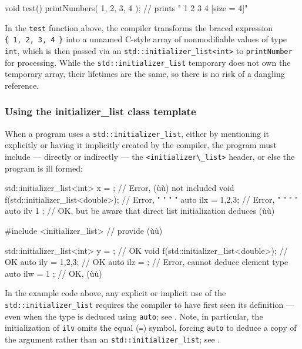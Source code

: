 \begin{emcppslisting}
void test()
{
    printNumbers({ 1, 2, 3, 4 });  // prints "{ 1 2 3 4 } [size = 4]"
}
\end{emcppslisting}
    

\noindent In the \lstinline!test! function above, the compiler transforms the braced
expression
\lstinline!{!~\lstinline!1,!~\lstinline!2,!~\lstinline!3,!~\lstinline!4!~\lstinline!}!
into a  unnamed C-style array of nonmodifiable values
of type \lstinline!int!, which is then passed via an
\lstinline!std::initializer_list<int>! to \lstinline!printNumber! for
processing. While the \lstinline!std::initializer_list! temporary does not
own the temporary array, their lifetimes are the same, so there is no
risk of a dangling reference.

\subsubsection[Using the \lstinline!initializer_list! class template]{Using the {\SubsubsecCode initializer\_list} class template}\label{using-the-initializer_list-class-template}

When a program uses a \lstinline!std::initializer_list!, either by
mentioning it explicitly or having it implicitly created by the
compiler, the program must include --- directly or indirectly --- the
\lstinline!<initializer\_list>! header, or else the program is ill formed:

\begin{emcppslisting}
std::initializer_list<int> x = { };  // Error, (ù{}ù) not included
void f(std::initializer_list<double>);  // Error,    "         "      "      "
auto ilx = {1,2,3};                     // Error,    "         "      "      "
auto ilv { 1 };  // OK, but be aware that direct list initialization deduces (ù{}ù)

#include <initializer_list>             // provide (ù{}ù)

std::initializer_list<int> y = { };     // OK
void f(std::initializer_list<double>);  // OK
auto ily = {1,2,3};                     // OK
auto ilz = { };                         // Error, cannot deduce element type
auto ilw = { 1 };                       // OK, (ù{}ù)
\end{emcppslisting}
    

\noindent In the example code above, any explicit or implicit use of the
\lstinline!std::initializer_list! requires the compiler to have first seen
its definition --- even when the type is deduced using \lstinline!auto!;
see . Note, in particular, the
initialization of \lstinline!ilv! omits the equal (\lstinline!=!) symbol,
forcing \lstinline!auto! to deduce a copy of the argument rather than an
\lstinline!std::initializer_list!; see . 

